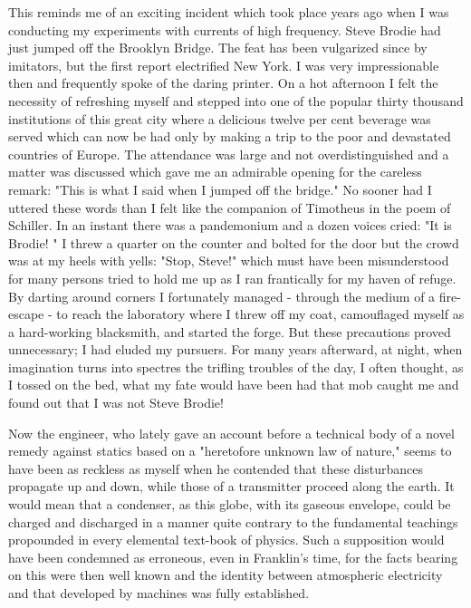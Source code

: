 \documentclass[a4paper,12pt,english,twoside,openright]{memoir}
\begin{document}
This reminds me of an exciting incident which took place years ago when I was conducting my 
experiments with currents of high frequency.  Steve Brodie had just jumped off the Brooklyn 
Bridge.  The feat has been vulgarized since by imitators, but the first report electrified New York.  
I was very impressionable then and frequently spoke of the daring printer.  On a hot afternoon I 
felt the necessity of refreshing myself and stepped into one of the popular thirty thousand 
institutions of this great city where a delicious twelve per cent beverage was served which can 
now be had only by making a trip to the poor and devastated countries of Europe.  The 
attendance was large and not overdistinguished and a matter was discussed which gave me an 
admirable opening for the careless remark: "This is what I said when I jumped off the bridge." No 
sooner had I uttered these words than I felt like the companion of Timotheus in the poem of 
Schiller.  In an instant there was a pandemonium and a dozen voices cried: "It is Brodie! " I threw 
a quarter on the counter and bolted for the door but the crowd was at my heels with yells: "Stop, 
Steve!" which must have been misunderstood for many persons tried to hold me up as I ran 
frantically for my haven of refuge.  By darting around corners I fortunately managed - through the 
medium of a fire-escape - to reach the laboratory where I threw off my coat, camouflaged myself 
as a hard-working blacksmith, and started the forge.  But these precautions proved unnecessary; 
I had eluded my pursuers.  For many years afterward, at night, when imagination turns into 
spectres the trifling troubles of the day, I often thought, as I tossed on the bed, what my fate 
would have been had that mob caught me and found out that I was not Steve Brodie! 


Now the engineer, who lately gave an account before a technical body of a novel remedy against 
statics based on a "heretofore unknown law of nature," seems to have been as reckless as 
myself when he contended that these disturbances propagate up and down, while those of a 
transmitter proceed along the earth.  It would mean that a condenser, as this globe, with its 
gaseous envelope, could be charged and discharged in a manner quite contrary to the 
fundamental teachings propounded in every elemental text-book of physics.  Such a supposition 
would have been condemned as erroneous, even in Franklin's time, for the facts bearing on this 
were then well known and the identity between atmospheric electricity and that developed by 
machines was fully established. 
\end{document}
